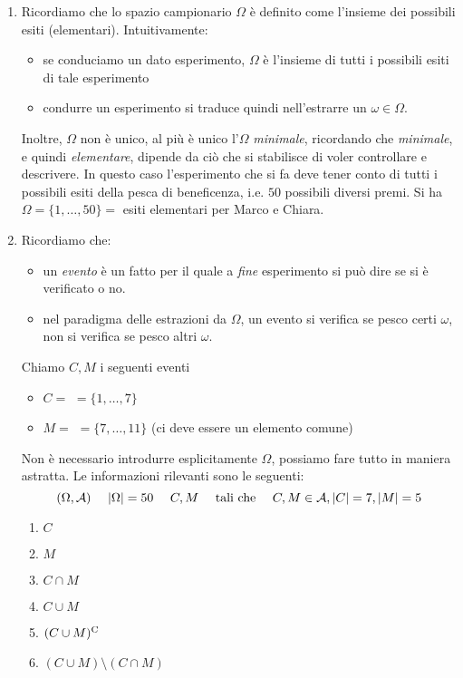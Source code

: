 \begin{enumerate}
	\item Ricordiamo che lo spazio campionario $\Omega $ è definito come l'insieme dei possibili esiti (elementari). Intuitivamente:
	\begin{itemize}
		\item se conduciamo un dato esperimento, $\Omega $ è l'insieme di tutti i possibili esiti di tale esperimento
		\item condurre un esperimento si traduce quindi nell'estrarre un $\omega \in \Omega $.
	\end{itemize}

Inoltre, $\Omega $ non è unico, al più è unico l'$\Omega $ \textit{minimale}, ricordando che \textit{minimale}, e quindi \textit{elementare}, dipende da ciò che si stabilisce di voler controllare e descrivere. In questo caso l'esperimento che si fa deve tener conto di tutti i possibili esiti della pesca di beneficenza, i.e. $50$ possibili diversi premi. Si ha $\Omega =\{1,\dots ,50\} =$ esiti elementari per Marco e Chiara.
	\item Ricordiamo che:
	\begin{itemize}
		\item un \textit{evento} è un fatto per il quale a \textit{fine} esperimento si può dire se si è verificato o no.
		\item nel paradigma delle estrazioni da $\Omega $, un evento si verifica se pesco certi $\omega $, non si verifica se pesco altri $\omega $.
	\end{itemize}

	Chiamo $C,M$ i seguenti eventi
	\begin{itemize}
		\item $C=$  $=\{1,\dots ,7\}$
		\item $M=$  $=\{7,\dots ,11\}$ (ci deve essere un elemento comune)
	\end{itemize}

\begin{oss}
Non è necessario introdurre esplicitamente $\Omega $, possiamo fare tutto in maniera astratta. Le informazioni rilevanti sono le seguenti:
\begin{equation*}
(\Omega ,\mathcal{A}) \ \ \ \ |\Omega| =50\ \ \ \ C,M\ \ \ \ \text{tali che} \ \ \ \ C,M\in \mathcal{A} ,| C| =7,| M| =5
\end{equation*}
\end{oss}
\begin{enumerate}
	\item $C$
	\item $M$
	\item $C\cap M$
	\item $C\cup M$
	\item $(C\cup M)^{\mathrm{C}}$
	\item $(C\cup M) \setminus (C\cap M)$
\end{enumerate}


\end{enumerate}
